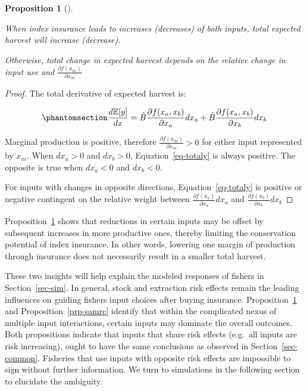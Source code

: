 \documentclass[
  letterpaper,
  DIV=11,
  numbers=noendperiod]{scrartcl}
\theoremstyle{plain}
\theoremstyle{plain}
\newtheorem{proposition}{Proposition}[section]
\theoremstyle{remark}
\begin{document}
\begin{proposition}[]\protect\hypertarget{prp-har}{}\label{prp-har}

When index insurance leads to increases (decreases) of both inputs,
total expected harvest will increase (decrease).

Otherwise, total change in expected harvest depends on the relative
change in input use and \(\frac{\partial f(x_m)}{\partial x_m}\)

\end{proposition}

\begin{proof}
The total derivative of expected harvest is:

\begin{equation}\phantomsection\label{eq-totaly}{
\frac{d \mathbb{E}[y]}{dx}=\hat{B}\frac{\partial f(x_a,x_b)}{\partial x_a}dx_a+\hat{B}\frac{\partial f(x_a,x_b)}{\partial x_b}dx_b
}\end{equation}

Marginal production is positive, therefore
\(\frac{\partial f(x_m)}{\partial x_m}>0\) for either input represented
by \(x_m\). When \(dx_a>0\) and \(dx_b>0\), Equation~\ref{eq-totaly} is
always positive. The opposite is true when \(dx_a<0\) and \(dx_b<0\).

For inputs with changes in opposite directions, Equation~\ref{eq-totaly}
is positive or negative contingent on the relative weight between
\(\frac{\partial f(x_a)}{\partial x_a}dx_a\) and
\(\frac{\partial f(x_b)}{\partial x_b}dx_b\)
\end{proof}

Proposition~\ref{prp-har} shows that reductions in certain inputs may be
offset by subsequent increases in more productive ones, thereby limiting
the conservation potential of index insurance. In other words, lowering
one margin of production through insurance does not necessarily result
in a smaller total harvest.

These two insights will help explain the modeled responses of fishers in
Section~\ref{sec-sim}. In general, stock and extraction risk effects
remain the leading influences on guiding fishers input choices after
buying insurance. Proposition~\ref{prp-har} and
Proposition~\ref{prp-samre} identify that within the complicated nexus
of multiple input interactions, certain inputs may dominate the overall
outcomes. Both propositions indicate that inputs that share risk effects
(e.g.~all inputs are risk increasing), ought to have the same
conclusions as observed in Section~\ref{sec-common}. Fisheries that use
inputs with opposite risk effects are impossible to sign without further
information. We turn to simulations in the following section to
elucidate the ambiguity.
\end{document}
